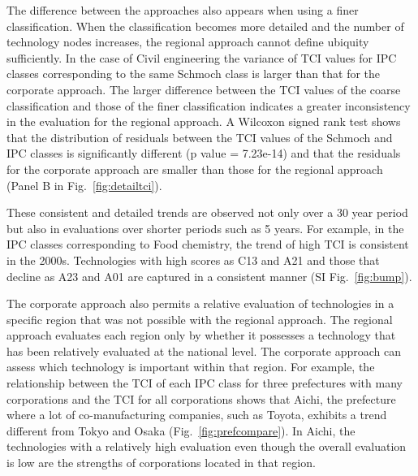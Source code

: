 The difference between the approaches also appears when using a finer classification. When the classification becomes more detailed and the number of technology nodes increases, the regional approach cannot define ubiquity sufficiently. 
In the case of Civil engineering the variance of TCI values for IPC classes corresponding to the same Schmoch class is larger than that for the corporate approach. 
The larger difference between the TCI values of the coarse classification and those of the finer classification indicates a greater inconsistency in the evaluation for the regional approach. 
A Wilcoxon signed rank test shows that the distribution of residuals between the TCI values of the Schmoch and IPC classes is significantly different (p value = 7.23e-14) and that the residuals for the corporate approach are smaller than those for the regional approach (Panel B in Fig.~\ref{fig:detailtci}).

These consistent and detailed trends are observed not only over a 30 year period but also in evaluations over shorter periods such as 5 years. For example, in the IPC classes corresponding to Food chemistry, the trend of high TCI is consistent in the 2000s. 
Technologies with high scores as C13 and A21 and those that decline as A23 and A01 are captured in a consistent manner (SI Fig.~\ref{fig:bump}).

The corporate approach also permits a relative evaluation of technologies in a specific region that was not possible with the regional approach. The regional approach evaluates each region only by whether it possesses a technology that has been relatively evaluated at the national level. The corporate approach can assess which technology is important within that region. For example, the relationship between the TCI of each IPC class for three prefectures with many corporations and the TCI for all corporations shows that Aichi, the prefecture where a lot of co-manufacturing companies, such as Toyota, exhibits a trend different from Tokyo and Osaka (Fig.~\ref{fig:prefcompare}). In Aichi, the technologies with a relatively high evaluation even though the overall evaluation is low are the strengths of corporations located in that region.


